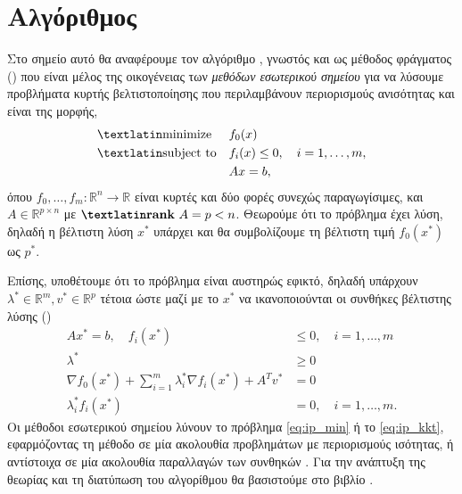 \section{Αλγόριθμος }
Στο σημείο αυτό θα αναφέρουμε τον αλγόριθμο , γνωστός και ως
μέθοδος φράγματος () που είναι μέλος της οικογένειας των
\emph{μεθόδων εσωτερικού σημείου} για να λύσουμε προβλήματα κυρτής βελτιστοποίησης
που περιλαμβάνουν περιορισμούς ανισότητας και είναι της μορφής,
\begin{equation}\label{eq:ip_min}
    \begin{aligned}
        & \text{\tl{minimize}}
        & & f_0(x) \\
        & \text{\tl{subject to}}
        & & f_i(x) \leq 0, \quad i = 1,\dots,m, \\
        &&& Ax = b,
    \end{aligned}
\end{equation}
όπου \( f_0, \dots, f_m : \mathbb{R}^n \to \mathbb{R} \) είναι κυρτές και δύο
φορές συνεχώς παραγωγίσιμες, και \( A \in \mathbb{R}^{p \times n} \) με
\( \textbf{\tl{rank}} \ A = p < n \). Θεωρούμε ότι το πρόβλημα έχει λύση, δηλαδή
η βέλτιστη λύση \( x^* \) υπάρχει και θα συμβολίζουμε τη βέλτιστη τιμή \(
f_0(x^*) \) ως \( p^* \).

Επίσης, υποθέτουμε ότι το πρόβλημα είναι αυστηρώς εφικτό, δηλαδή υπάρχουν
\( \lambda^* \in \mathbb{R}^m, v^* \in \mathbb{R}^p \) τέτοια ώστε μαζί με το
\(x^*\) να ικανοποιούνται οι συνθήκες βέλτιστης λύσης 
()
\begin{equation}\label{eq:ip_kkt}
    \begin{split}
        Ax^* = b, \quad f_i(x^*) &\leq 0,\quad i = 1, \dots, m\\
        \lambda^* &\geq 0\\
        \nabla f_0(x^*) + \sum_{i=1}^m \lambda_i^* \nabla f_i(x^*) + A^Tv^* & = 0 \\
        \lambda_i^*f_i(x^*) & = 0,\quad i = 1, \dots, m.
    \end{split}
\end{equation}
Οι μέθοδοι εσωτερικού σημείου λύνουν το πρόβλημα \eqref{eq:ip_min} ή το
\eqref{eq:ip_kkt}, εφαρμόζοντας τη μέθοδο  σε μία ακολουθία
προβλημάτων με περιορισμούς ισότητας, ή αντίστοιχα σε μία ακολουθία παραλλαγών
των συνθηκών . Για την ανάπτυξη της θεωρίας και τη διατύπωση του
αλγορίθμου θα βασιστούμε στο βιβλίο \cite{boyd2004convex}.

